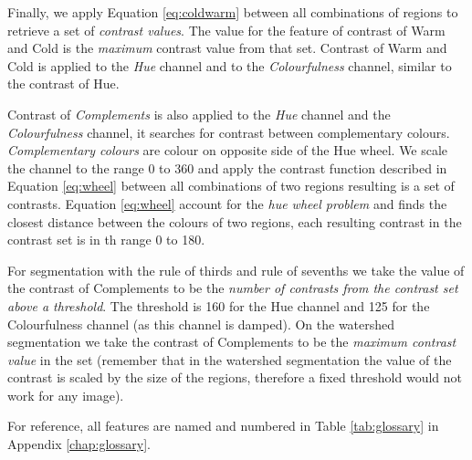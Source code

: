 \documentclass[11pt,a4paper,twoside,openright,draft]{report}
\begin{document}
\begin{multicols}{2}
Finally, we apply Equation \ref{eq:coldwarm} between all combinations of
regions to retrieve a set of \emph{contrast values}.  The value for the feature
of contrast of Warm and Cold is the \emph{maximum} contrast value from that
set.  Contrast of Warm and Cold is applied to the \emph{Hue} channel and to the
\emph{Colourfulness} channel, similar to the contrast of Hue.

Contrast of \emph{Complements} is also applied to the \emph{Hue} channel and
the \emph{Colourfulness} channel, it searches for contrast between
complementary colours.  \emph{Complementary colours} are colour on opposite
side of the Hue wheel.  We scale the channel to the range 0 to 360 and apply
the contrast function described in Equation \ref{eq:wheel} between all
combinations of two regions resulting is a set of contrasts.  Equation
\ref{eq:wheel} account for the \emph{hue wheel problem} and finds the closest
distance between the colours of two regions, each resulting contrast in the
contrast set is in th range 0 to 180.

For segmentation with the rule of thirds and rule of sevenths we take the value
of the contrast of Complements to be the \emph{number of contrasts from the
contrast set above a threshold}.  The threshold is 160 for the Hue channel and
125 for the Colourfulness channel (as this channel is damped).  On the
watershed segmentation we take the contrast of Complements to be the
\emph{maximum contrast value} in the set (remember that in the watershed
segmentation the value of the contrast is scaled by the size of the regions,
therefore a fixed threshold would not work for any image).

For reference, all features are named and numbered in Table \ref{tab:glossary}
in Appendix \ref{chap:glossary}.



\end{multicols}
\end{document}
